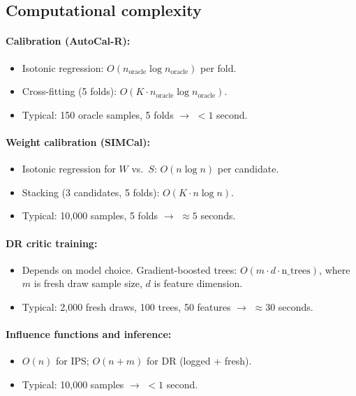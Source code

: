 \subsection{Computational complexity}

\paragraph{Calibration (AutoCal-R):}
\begin{itemize}
\item Isotonic regression: $O(n_{\text{oracle}} \log n_{\text{oracle}})$ per fold.
\item Cross-fitting (5 folds): $O(K \cdot n_{\text{oracle}} \log n_{\text{oracle}})$.
\item Typical: 150 oracle samples, 5 folds $\to$ $< 1$ second.
\end{itemize}

\paragraph{Weight calibration (SIMCal):}
\begin{itemize}
\item Isotonic regression for $W$ vs.\ $S$: $O(n \log n)$ per candidate.
\item Stacking (3 candidates, 5 folds): $O(K \cdot n \log n)$.
\item Typical: 10,000 samples, 5 folds $\to$ $\approx 5$ seconds.
\end{itemize}

\paragraph{DR critic training:}
\begin{itemize}
\item Depends on model choice. Gradient-boosted trees: $O(m \cdot d \cdot \text{n\_trees})$, where $m$ is fresh draw sample size, $d$ is feature dimension.
\item Typical: 2,000 fresh draws, 100 trees, 50 features $\to$ $\approx 30$ seconds.
\end{itemize}

\paragraph{Influence functions and inference:}
\begin{itemize}
\item $O(n)$ for IPS; $O(n + m)$ for DR (logged + fresh).
\item Typical: 10,000 samples $\to$ $< 1$ second.
\end{itemize}

